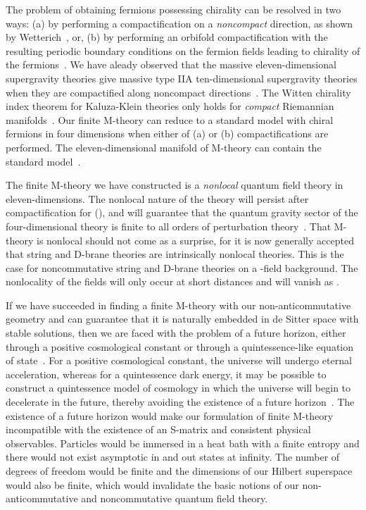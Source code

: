 \documentclass[a4paper,12pt]{article}
\begin{document}
The problem of obtaining fermions possessing chirality can be resolved in
two ways: (a) by performing a compactification on a {\it noncompact}
direction, as shown by Wetterich~\cite{Wetterich}, or, (b) by performing an
orbifold compactification with the resulting periodic boundary conditions
on the fermion fields leading to chirality of the fermions~\cite{Georgi}.
We have aleady observed that the massive eleven-dimensional supergravity
theories give massive type IIA ten-dimensional supergravity theories when
they are compactified along noncompact directions~\cite{Pope}. The Witten
chirality index theorem for Kaluza-Klein theories only holds for {\it
compact} Riemannian manifolds~\cite{Witten2}. Our finite M-theory can
reduce to a standard model with chiral fermions in four dimensions when
either of (a) or (b) compactifications are performed. The
eleven-dimensional manifold of M-theory can contain the \coordHE{} standard model~\cite{Witten3}.

The finite M-theory we have constructed is a {\it nonlocal} quantum field
theory in eleven-dimensions. The nonlocal nature of the theory will
persist after compactification for \myHighlight{$\Lambda < \infty$}\coordHE{} (\coordHE{}), and
will guarantee that the quantum gravity sector of the four-dimensional
theory is finite to all orders of perturbation theory~\cite{Moffat3}. That
M-theory is nonlocal should not come as a surprise, for it is now generally
accepted that string and D-brane theories are intrinsically nonlocal
theories. This is the case for noncommutative string and
D-brane theories on a \coordHE{}-field background. The nonlocality of the fields
will only occur at short distances and will vanish as
\myHighlight{$\Lambda\rightarrow\infty$}\coordHE{}.

If we have succeeded in finding a finite M-theory with our
non-anticommutative geometry and can guarantee that it is naturally
embedded in de Sitter space with stable solutions, then we are faced with
the problem of a future horizon, either through a positive cosmological
constant or through a quintessence-like equation of
state~\cite{Susskind}. For a positive cosmological constant, the
universe will undergo eternal acceleration, whereas for a quintessence dark
energy, it may be possible to construct a quintessence model of cosmology
in which the universe will begin to decelerate in the future, thereby
avoiding the existence of a future horizon~\cite{Cline}. The existence of a
future horizon would make our formulation of finite M-theory incompatible
with the existence of an S-matrix and consistent physical observables.
Particles would be immersed in a heat bath with a finite entropy and there
would not exist asymptotic in and out states at infinity. The number of
degrees of freedom would be finite and the dimensions of our Hilbert
superspace would also be finite, which would invalidate the
basic notions of our non-anticommutative and noncommutative quantum field
theory.
\end{document}
